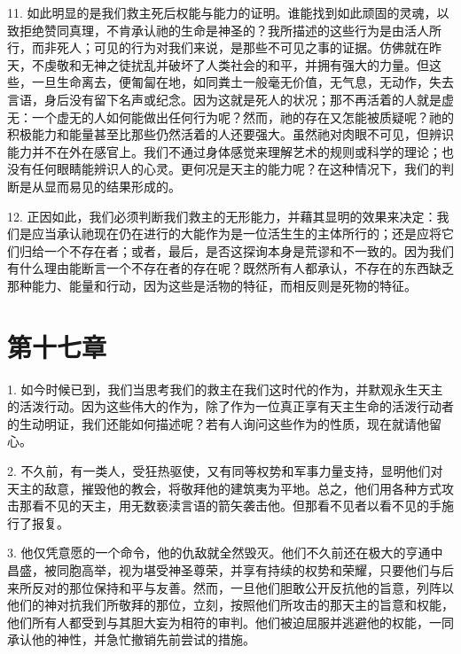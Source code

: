 11. 如此明显的是我们救主死后权能与能力的证明。谁能找到如此顽固的灵魂，以致拒绝赞同真理，不肯承认祂的生命是神圣的？我所描述的这些行为是由活人所行，而非死人；可见的行为对我们来说，是那些不可见之事的证据。仿佛就在昨天，不虔敬和无神之徒扰乱并破坏了人类社会的和平，并拥有强大的力量。但这些，一旦生命离去，便匍匐在地，如同粪土一般毫无价值，无气息，无动作，失去言语，身后没有留下名声或纪念。因为这就是死人的状况；那不再活着的人就是虚无：一个虚无的人如何能做出任何行为呢？然而，祂的存在又怎能被质疑呢？祂的积极能力和能量甚至比那些仍然活着的人还要强大。虽然祂对肉眼不可见，但辨识能力并不在外在感官上。我们不通过身体感觉来理解艺术的规则或科学的理论；也没有任何眼睛能辨识人的心灵。更何况是天主的能力呢？在这种情况下，我们的判断是从显而易见的结果形成的。\par

12. 正因如此，我们必须判断我们救主的无形能力，并藉其显明的效果来决定：我们是应当承认祂现在仍在进行的大能作为是一位活生生的主体所行的；还是应将它们归给一个不存在者；或者，最后，是否这探询本身是荒谬和不一致的。因为我们有什么理由能断言一个不存在者的存在呢？既然所有人都承认，不存在的东西缺乏那种能力、能量和行动，因为这些是活物的特征，而相反则是死物的特征。\par


\section{第十七章}

1. 如今时候已到，我们当思考我们的救主在我们这时代的作为，并默观永生天主的活泼行动。因为这些伟大的作为，除了作为一位真正享有天主生命的活泼行动者的生动明证，我们还能如何描述呢？若有人询问这些作为的性质，现在就请他留心。\par

2. 不久前，有一类人，受狂热驱使，又有同等权势和军事力量支持，显明他们对天主的敌意，摧毁他的教会，将敬拜他的建筑夷为平地。总之，他们用各种方式攻击那看不见的天主，用无数亵渎言语的箭矢袭击他。但那看不见者以看不见的手施行了报复。\par

3. 他仅凭意愿的一个命令，他的仇敌就全然毁灭。他们不久前还在极大的亨通中昌盛，被同胞高举，视为堪受神圣尊荣，并享有持续的权势和荣耀，只要他们与后来所反对的那位保持和平与友善。然而，一旦他们胆敢公开反抗他的旨意，列阵以他们的神对抗我们所敬拜的那位，立刻，按照他们所攻击的那天主的旨意和权能，他们所有人都受到与其胆大妄为相符的审判。他们被迫屈服并逃避他的权能，一同承认他的神性，并急忙撤销先前尝试的措施。\par

